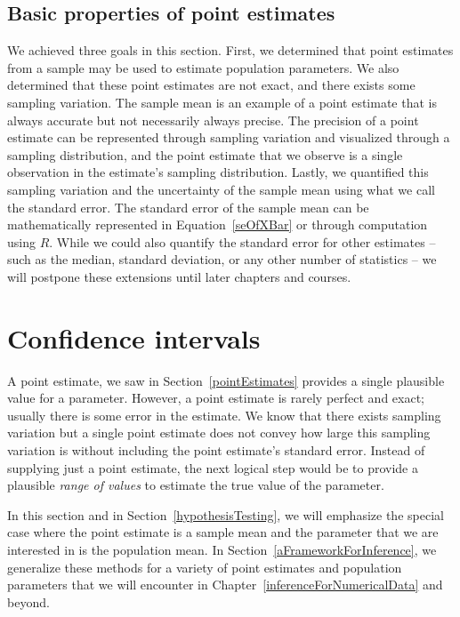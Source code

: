\subsection{Basic properties of point estimates}

We achieved three goals in this section. First, we determined that point estimates from a sample may be used to estimate population parameters. We also determined that these point estimates are not exact, and there exists some sampling variation. The sample mean is an example of a point estimate that is always accurate but not necessarily always precise. The precision of a point estimate can be represented through sampling variation and visualized through a sampling distribution, and the point estimate that we observe is a single observation in the estimate's sampling distribution. Lastly, we quantified this sampling variation and the uncertainty of the sample mean using what we call the standard error. The standard error of the sample mean can be mathematically represented in Equation~\eqref{seOfXBar} or through computation using $R$. While we could also quantify the standard error for other estimates -- such as the median, standard deviation, or any other number of statistics -- we will postpone these extensions until later chapters and courses.


\section{Confidence intervals}
\label{confidenceIntervals}


A point estimate, we saw in Section~\ref{pointEstimates} provides a single plausible value for a parameter. However, a point estimate is rarely perfect and exact; usually there is some error in the estimate. We know that there exists sampling variation but a single point estimate does not convey how large this sampling variation is without including the point estimate's standard error. Instead of supplying just a point estimate, the next logical step would be to provide a plausible \emph{range of values} to estimate the true value of the parameter.

In this section and in Section~\ref{hypothesisTesting}, we will emphasize the special case where the point estimate is a sample mean and the parameter that we are interested in is the population mean. In Section~\ref{aFrameworkForInference}, we generalize these methods for a variety of point estimates and population parameters that we will encounter in Chapter~\ref{inferenceForNumericalData} and beyond.

